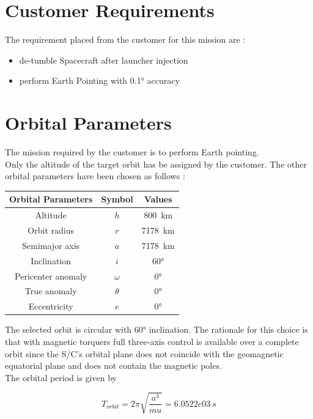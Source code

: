 \documentclass[11pt,a4paper]{report}
\begin{document}
\section{Customer Requirements}
The requirement placed from the customer for this mission are :

\begin{itemize}
 \item de-tumble Spacecraft after launcher injection
 \item perform Earth Pointing with \ang{0.1} accuracy
\end{itemize}

\section{Orbital Parameters}
The mission required by the customer is to perform Earth pointing. \\   
Only the altitude of the target orbit has be assigned by the customer. The other orbital parameters have been chosen as follows : 

\begin{table}[H]
	\centering
	\begin{tabular}{|c|c|c|}
		\hline
		Orbital Parameters & Symbol & Values \\
		\hline
		Altitude & $h$ & \SI{800}{\km} \\ 
		\hline
		Orbit radius & $r$ & \SI{7178}{\km}\\
		\hline
		Semimajor axis & $a$ & \SI{7178}{\km}\\
		\hline
		Inclination & $i$ & \ang{60}\\
		\hline
		Pericenter anomaly & $\omega$ & \ang{0}\\
		\hline
		True anomaly & $\theta$ &  \ang{0}\\
		\hline
		Eccentricity & $e$ &  \ang{0}\\
		\hline
	\end{tabular}
\end{table}

The selected orbit is circular with \ang{60} inclination.
The rationale for this choice is that with magnetic torquers full three-axis control is available over a complete orbit since the S/C's orbital plane does not coincide with the geomagnetic equatorial plane and does not contain the magnetic poles. \\
The orbital period is given by 

$$T_{orbit} = 2\pi\sqrt{\frac{a^{3}}{mu}} = 6.0522e03 \ s$$
\end{document}
